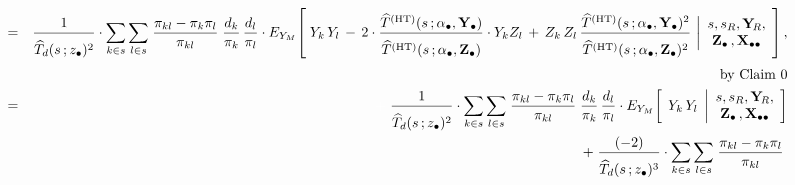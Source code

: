 \begin{enumerate}
\begin{eqnarray*}
    \\
    & = &
        \dfrac{1}{
            \overset{{\color{white}.}}{
                \widehat{T}_{d}(s\,;\zdot)^{2}
                }
            }
        \cdot
        \underset{k \in s}{\sum}\,
        \underset{l \in s}{\sum}\;
        \dfrac{\pi_{kl} - \pi_{k}\pi_{l}}{\pi_{kl}}\;
        \dfrac{d_{k}}{\pi_{k}}\,
        \dfrac{d_{l}}{\pi_{l}}
        \cdot
        E_{Y_{M}}\!\left[\;
            Y_{k}\,Y_{l}
            \, - \,
            {\color{black}2}
            \cdot
            \dfrac{
                \widehat{T}^{\textnormal{(HT)}}(s\,;\abullet,\Ydot)
                }{
                \overset{{\color{white}.}}{\widehat{T}^{\textnormal{(HT)}}(s\,;\abullet,\Zdot)}
                }
            \cdot
            {\color{black}Y_{k}Z_{l}}
            \, + \,
            Z_{k}\,Z_{l}\,
            \dfrac{
                \widehat{T}^{\textnormal{(HT)}}(s\,;\abullet,\Ydot)^{2}
                }{
                \overset{{\color{white}.}}{\widehat{T}^{\textnormal{(HT)}}(s\,;\abullet,\Zdot)^{2}}
                }
            \,\left\vert
            \begin{array}{c}
                s,s_{R},\YsubR, \\ \Zdot\,,\Xobs
                \end{array}
            \right.
            \!\right],
    \\
    &&
        \quad
        \overset{{\color{white}.}}{\textnormal{by Claim 0}}
    \\
    & = &
        \; {\color{white}+} \;
        \dfrac{1}{
            \overset{{\color{white}.}}{\widehat{T}_{d}(s\,;\zdot)^{2}}
            }
        \cdot
        \underset{k \in s}{\sum}\,
        \underset{l \in s}{\sum}\;
        \dfrac{\pi_{kl} - \pi_{k}\pi_{l}}{\pi_{kl}}\;
        \dfrac{d_{k}}{\pi_{k}}\,
        \dfrac{d_{l}}{\pi_{l}}
        \cdot
        E_{Y_{M}}\!\left[\;\,
            Y_{k}\,Y_{l}
            \;\left\vert
            \begin{array}{c}
                s,s_{R},\YsubR, \\ \Zdot\,,\Xobs
                \end{array}
            \right.
            \!\right]
    \\
    &&
        \; + \;
        \dfrac{
            (-2)
            }{
            \overset{{\color{white}.}}{\widehat{T}_{d}(s\,;\zdot)^{3}}
            }
        \cdot
        \underset{k \in s}{\sum}\,
        \underset{l \in s}{\sum}\;
        \dfrac{\pi_{kl} - \pi_{k}\pi_{l}}{\pi_{kl}}\;

\end{eqnarray*}
\end{enumerate}
